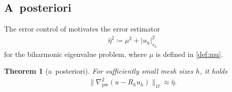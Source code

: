 \documentclass[a4paper]{amsart}
\numberwithin{equation}{section}
\def\pw{\mathrm{pw}}
\newtheorem{theorem}{Theorem}[section]
\theoremstyle{definition}
\theoremstyle{remark}
\numberwithin{theorem}{section}
\numberwithin{equation}{section}
\numberwithin{table}{section}
\numberwithin{figure}{section}
\begin{document}
\subsection{A~posteriori}
The error control of  motivates the error estimator
\begin{align*}
	\widehat{\eta}^2 \coloneqq \mu^2 + |u_h|_{s_h}^2
\end{align*}
for the biharmonic eigenvalue problem, where $\mu$ is defined in \eqref{def:mu}.
\begin{theorem}[a~posteriori]\label{thm:a-posteriori-eig}
	For sufficiently small mesh sizes $h$, it holds
	\begin{align*}
		\|\nabla_\pw^2(u - R_h u_h)\|_\Omega \approx \widehat{\eta}.
	\end{align*}
\end{theorem}
\end{document}
